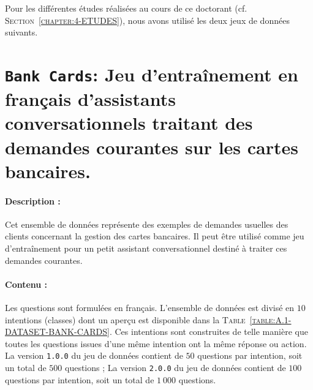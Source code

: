 \Annexes

\label{annex:A-ANNEXE-DATASET}

	Pour les différentes études réalisées au cours de ce doctorant (cf. \textsc{Section~\ref{chapter:4-ETUDES}}), nous avons utilisé les deux jeux de données suivants.

	\minitoc

	\section{\texttt{Bank Cards}: Jeu d'entraînement en français d'assistants conversationnels traitant des demandes courantes sur les cartes bancaires.}
	\label{annex:A.1-DATASET-BANK-CARDS}
		
		
		\paragraph{Description :}
		Cet ensemble de données représente des exemples de demandes usuelles des clients concernant la gestion des cartes bancaires.
		Il peut être utilisé comme jeu d'entraînement pour un petit assistant conversationnel destiné à traiter ces demandes courantes.
		
		\paragraph{Contenu :}
		Les questions sont formulées en français.
		L'ensemble de données est divisé en $10$ intentions (classes) dont un aperçu est disponible dans la \textsc{Table~\ref{table:A.1-DATASET-BANK-CARDS}}.
		Ces intentions sont construites de telle manière que toutes les questions issues d'une même intention ont la même réponse ou action.
		La version \texttt{1.0.0} du jeu de données contient de $50$ questions par intention, soit un total de $500$ questions ;
		La version \texttt{2.0.0} du jeu de données contient de $100$ questions par intention, soit un total de $1~000$ questions.
		
